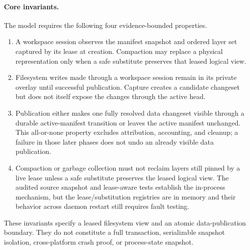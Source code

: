 \paragraph{Core invariants.}
The model requires the following four evidence-bounded properties.

\begin{enumerate}
  \item A workspace session observes the manifest snapshot and ordered layer
    set captured by its lease at creation.  Compaction may replace a physical
    representation only when a safe substitute preserves that leased logical
    view.

  \item Filesystem writes made through a workspace session remain in its
    private overlay until successful publication.  Capture creates a candidate
    changeset but does not itself expose the changes through the active head.

  \item Publication either makes one fully resolved data changeset visible
    through a durable active-manifest transition or leaves the active manifest
    unchanged.  This all-or-none property excludes attribution, accounting,
    and cleanup; a failure in those later phases does not undo an already
    visible data publication.

  \item Compaction or garbage collection must not reclaim layers still pinned
    by a live lease unless a safe substitute preserves the leased logical
    view.  The audited source snapshot and lease-aware tests establish the in-process
    mechanism, but the lease/substitution registries are in memory and their
    behavior across daemon restart still requires fault testing.
\end{enumerate}

These invariants specify a leased filesystem view and an atomic data-publication
boundary.  They do not constitute a full transaction, serializable snapshot
isolation, cross-platform crash proof, or process-state snapshot.
